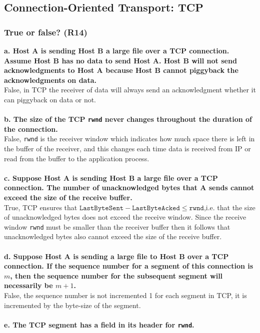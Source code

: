 \subsection{Connection-Oriented Transport: TCP}

\subsubsection{True or false? (R14)}

\textbf{a. Host A is sending Host B a large file over a TCP connection. Assume Host B has no data to send Host A. Host B will not send acknowledgments to Host A because Host B cannot piggyback the acknowledgments on data.} \\
False, in TCP the receiver of data will always send an acknowledgment whether it can piggyback on data or not. \\
\\
\textbf{b. The size of the TCP \texttt{rwnd} never changes throughout the duration of the connection.} \\
False, \texttt{rwnd} is the receiver window which indicates how much space there is left in the buffer of the receiver, and this changes each time data is received from IP or read from the buffer to the application process. \\
\\
\textbf{c. Suppose Host A is sending Host B a large file over a TCP connection. The number of unacknowledged bytes that A sends cannot exceed the size of the receive buffer.} \\
True, TCP ensures that $\texttt{LastByteSent} - \texttt{LastByteAcked} \leq \texttt{rwnd}$,i.e. that the size of unacknowledged bytes does not exceed the receive window. Since the receive window \texttt{rwnd} must be smaller than the receiver buffer then it follows that unacknowledged bytes also cannot exceed the size of the receive buffer. \\
\\
\textbf{d. Suppose Host A is sending a large file to Host B over a TCP connection. If the sequence number for a segment of this connection is $m$, then the sequence number for the subsequent segment will necessarily be $m + 1$.} \\
False, the sequence number is not incremented 1 for each segment in TCP, it is incremented by the byte-size of the segment. \\
\\
\textbf{e. The TCP segment has a field in its header for \texttt{rwnd}.} \\
